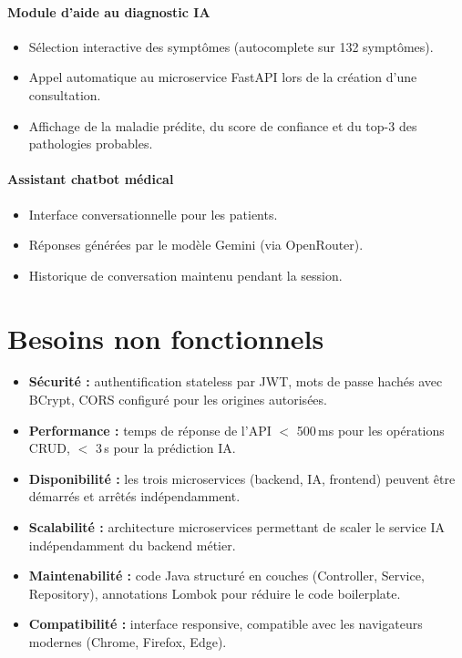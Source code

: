 \documentclass[12pt,a4paper]{report}
\begin{document}
\paragraph{Module d'aide au diagnostic IA}
\begin{itemize}
    \item Sélection interactive des symptômes (autocomplete sur 132 symptômes).
    \item Appel automatique au microservice FastAPI lors de la création d'une
    consultation.
    \item Affichage de la maladie prédite, du score de confiance et du top-3 des
    pathologies probables.
\end{itemize}

\paragraph{Assistant chatbot médical}
\begin{itemize}
    \item Interface conversationnelle pour les patients.
    \item Réponses générées par le modèle Gemini (via OpenRouter).
    \item Historique de conversation maintenu pendant la session.
\end{itemize}

\section{Besoins non fonctionnels}

\begin{itemize}
    \item \textbf{Sécurité :} authentification stateless par JWT, mots de passe
    hachés avec BCrypt, CORS configuré pour les origines autorisées.

    \item \textbf{Performance :} temps de réponse de l'API $<$ 500\,ms pour les
    opérations CRUD, $<$ 3\,s pour la prédiction IA.

    \item \textbf{Disponibilité :} les trois microservices (backend, IA, frontend)
    peuvent être démarrés et arrêtés indépendamment.

    \item \textbf{Scalabilité :} architecture microservices permettant de scaler le
    service IA indépendamment du backend métier.

    \item \textbf{Maintenabilité :} code Java structuré en couches (Controller,
    Service, Repository), annotations Lombok pour réduire le code boilerplate.

    \item \textbf{Compatibilité :} interface responsive, compatible avec les
    navigateurs modernes (Chrome, Firefox, Edge).
\end{itemize}
\end{document}
